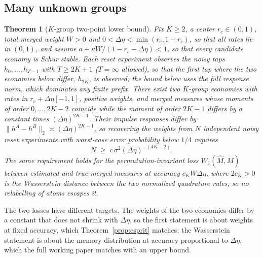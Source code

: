 \documentclass[12pt]{article}
\newtheorem{theorem}{Theorem}[section]
\theoremstyle{definition}
\theoremstyle{remark}
\begin{document}
\subsection{Many unknown groups}

\begin{theorem}[$K$-group two-point lower bound]\label{thm:kcohort}
Fix $K\ge2$, a center $r_c\in(0,1)$, total merged weight $W>0$ and $0<\Delta\eta<\min(r_c,1-r_c)$, so that all rates lie in $(0,1)$, and assume $a+\kappa W/(1-r_c-\Delta\eta)<1$, so that every candidate economy is Schur stable. Each reset experiment observes the noisy taps $h_0,\ldots,h_{T-1}$ with $T\ge2K+1$ ($T=\infty$ allowed), so that the first tap where the two economies below differ, $h_{2K}$, is observed; the bound below uses the full response norm, which dominates any finite prefix. There exist two $K$-group economies with rates in $r_c+\Delta\eta[-1,1]$, positive weights, and merged measures whose moments of order $0,\ldots,2K-2$ coincide while the moment of order $2K-1$ differs by a constant times $(\Delta\eta)^{2K-1}$. Their impulse responses differ by $\|h^A-h^B\|_2\asymp(\Delta\eta)^{2K-1}$, so recovering the weights from $N$ independent noisy reset experiments with worst-case error probability below $1/4$ requires
\[
N\;\ge\;c\,\sigma^2(\Delta\eta)^{-(4K-2)} .
\]
The same requirement holds for the permutation-invariant loss $W_1(\hat M,M)$ between estimated and true merged measures at accuracy $c_KW\Delta\eta$, where $2c_K>0$ is the Wasserstein distance between the two normalized quadrature rules, so no relabelling of atoms escapes it.
\end{theorem}

The two losses have different targets. The weights of the two economies differ by a constant that does not shrink with $\Delta\eta$, so the first statement is about weights at fixed accuracy, which Theorem~\ref{prop:esprit} matches; the Wasserstein statement is about the memory distribution at accuracy proportional to $\Delta\eta$, which the full working paper matches with an upper bound.
\end{document}
